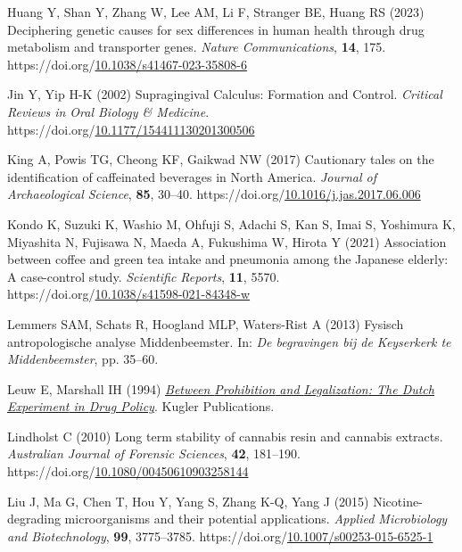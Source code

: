 \documentclass[
  11pt,
  leqno]{scrartcl}
\newlength{\cslhangindent}
\newenvironment{CSLReferences}[2] %
 {\begin{list}{}{%
  \setlength{\itemindent}{0pt}
  \setlength{\leftmargin}{0pt}
  \setlength{\parsep}{0pt}
  \ifodd #1
   \setlength{\leftmargin}{\cslhangindent}
   \setlength{\itemindent}{-1\cslhangindent}
  \fi
  \setlength{\itemsep}{#2\baselineskip}}}
 {\end{list}}
\begin{document}
\begin{CSLReferences}{1}{0}
Huang Y, Shan Y, Zhang W, Lee AM, Li F, Stranger BE, Huang RS (2023)
Deciphering genetic causes for sex differences in human health through
drug metabolism and transporter genes. \emph{Nature Communications},
\textbf{14}, 175.
https://doi.org/\href{https://doi.org/10.1038/s41467-023-35808-6}{10.1038/s41467-023-35808-6}

Jin Y, Yip H-K (2002) Supragingival {Calculus}: {Formation} and
{Control}. \emph{Critical Reviews in Oral Biology \& Medicine}.
https://doi.org/\href{https://doi.org/10.1177/154411130201300506}{10.1177/154411130201300506}

King A, Powis TG, Cheong KF, Gaikwad NW (2017) Cautionary tales on the
identification of caffeinated beverages in {North America}.
\emph{Journal of Archaeological Science}, \textbf{85}, 30--40.
https://doi.org/\href{https://doi.org/10.1016/j.jas.2017.06.006}{10.1016/j.jas.2017.06.006}

Kondo K, Suzuki K, Washio M, Ohfuji S, Adachi S, Kan S, Imai S,
Yoshimura K, Miyashita N, Fujisawa N, Maeda A, Fukushima W, Hirota Y
(2021) Association between coffee and green tea intake and pneumonia
among the {Japanese} elderly: A case-control study. \emph{Scientific
Reports}, \textbf{11}, 5570.
https://doi.org/\href{https://doi.org/10.1038/s41598-021-84348-w}{10.1038/s41598-021-84348-w}

Lemmers SAM, Schats R, Hoogland MLP, Waters-Rist A (2013) Fysisch
antropologische analyse Middenbeemster. In: \emph{De begravingen bij de
Keyserkerk te Middenbeemster}, pp. 35--60.

Leuw E, Marshall IH (1994)
\emph{\href{https://books.google.com?id=2mAVkStNG5EC}{Between
{Prohibition} and {Legalization}: {The Dutch Experiment} in {Drug
Policy}}}. {Kugler Publications}.

Lindholst C (2010) Long term stability of cannabis resin and cannabis
extracts. \emph{Australian Journal of Forensic Sciences}, \textbf{42},
181--190.
https://doi.org/\href{https://doi.org/10.1080/00450610903258144}{10.1080/00450610903258144}

Liu J, Ma G, Chen T, Hou Y, Yang S, Zhang K-Q, Yang J (2015)
Nicotine-degrading microorganisms and their potential applications.
\emph{Applied Microbiology and Biotechnology}, \textbf{99}, 3775--3785.
https://doi.org/\href{https://doi.org/10.1007/s00253-015-6525-1}{10.1007/s00253-015-6525-1}


\end{CSLReferences}
\end{document}
